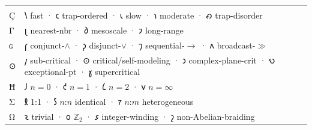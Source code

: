 \documentclass[12pt,a4paper]{article}
\newcommand{\heb}[1]{{\igprimfont #1}}
\begin{document}
\begin{longtable}[]{@{}ll@{}}
\begin{minipage}[t]{0.47\columnwidth}
\end{minipage}\tabularnewline
\begin{minipage}[t]{0.47\columnwidth}\raggedright
\heb{Ç}\strut
\end{minipage} & \begin{minipage}[t]{0.47\columnwidth}\raggedright
𐑘 fast · 𐑤 trap-ordered · 𐑧 slow · 𐑪 moderate · 𐑺 trap-disorder\strut
\end{minipage}\tabularnewline
\begin{minipage}[t]{0.47\columnwidth}\raggedright
\heb{Γ}\strut
\end{minipage} & \begin{minipage}[t]{0.47\columnwidth}\raggedright
𐑚 nearest-nbr · 𐑔 mesoscale · 𐑲 long-range\strut
\end{minipage}\tabularnewline
\begin{minipage}[t]{0.47\columnwidth}\raggedright
\heb{ɢ}\strut
\end{minipage} & \begin{minipage}[t]{0.47\columnwidth}\raggedright
𐑝 conjunct-\(\wedge\) · 𐑜 disjunct-\(\vee\) · 𐑠 sequential-\(\to\) · 𐑵
broadcast-\(\gg\)\strut
\end{minipage}\tabularnewline
\begin{minipage}[t]{0.47\columnwidth}\raggedright
\heb{⊙}\strut
\end{minipage} & \begin{minipage}[t]{0.47\columnwidth}\raggedright
𐑢 sub-critical · ⊙ critical/self-modeling · 𐑮 complex-plane-crit · 𐑻
exceptional-pt · 𐑣 supercritical\strut
\end{minipage}\tabularnewline
\begin{minipage}[t]{0.47\columnwidth}\raggedright
\heb{Ħ}\strut
\end{minipage} & \begin{minipage}[t]{0.47\columnwidth}\raggedright
𐑓 \(n=0\) · 𐑒 \(n=1\) · 𐑖 \(n=2\) · 𐑫 \(n=\infty\)\strut
\end{minipage}\tabularnewline
\begin{minipage}[t]{0.47\columnwidth}\raggedright
\heb{Σ}\strut
\end{minipage} & \begin{minipage}[t]{0.47\columnwidth}\raggedright
𐑙 1:1 · 𐑕 \(n\):\(n\) identical · 𐑳 \(n\):\(m\) heterogeneous\strut
\end{minipage}\tabularnewline
\begin{minipage}[t]{0.47\columnwidth}\raggedright
\heb{Ω}\strut
\end{minipage} & \begin{minipage}[t]{0.47\columnwidth}\raggedright
𐑷 trivial · 𐑴 \(\mathbb{Z}_2\) · 𐑭 integer-winding · 𐑟
non-Abelian-braiding\strut
\end{minipage}\tabularnewline
\bottomrule
\end{longtable}
\end{document}
